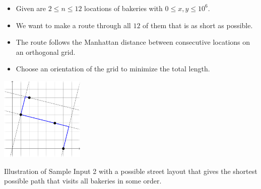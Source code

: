 \begin{frame}
  \frametitle{\problemtitle}

  \begin{itemize}
  \item Given are $2\leq n\leq 12$ locations of bakeries with $0\leq x, y\leq 10^6$.
  \item We want to make a route through all $12$ of them that is as short as possible.
  \item The route follows the Manhattan distance between consecutive locations on an orthogonal grid.
  \item Choose an orientation of the grid to minimize the total length.
  \end{itemize}

  \vspace{0.5em}
  \centering
  \includegraphics[width=0.30\textwidth]{sample2.pdf}

  \small
  Illustration of Sample Input 2 with a possible street layout that gives the shortest possible path that visits all bakeries in some order.
\end{frame}
